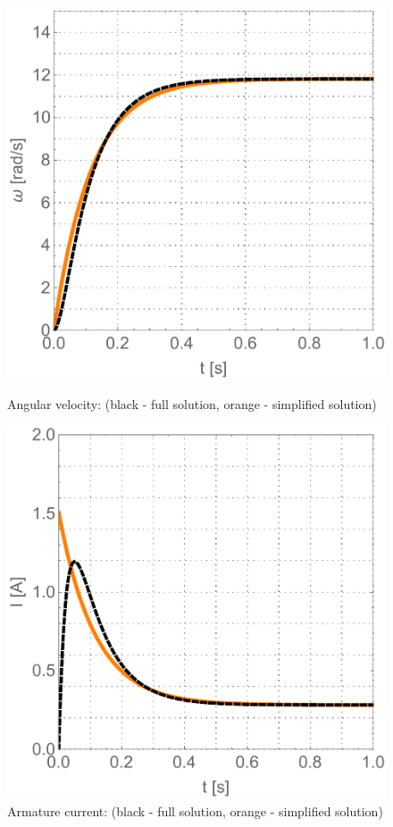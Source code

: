 \documentclass[12pt,english,twoside]{article}
\begin{document}
 \begin{figure}[htb!]
	\centering
	\includegraphics[width=\textwidth]{figures/mahemetica_comparision_1}
	\caption{Angular velocity: (black - full solution, orange - simplified solution)}
	\label{mahemetica_comparision_1}
	\endminipage\hfill
	\centering
	\includegraphics[width=\textwidth]{figures/mahemetica_comparision_2}
	\caption{Armature current: (black - full solution, orange - simplified solution)}
	\label{mahemetica_comparision_2}
	\endminipage\hfill
\end{figure}
\end{document}
